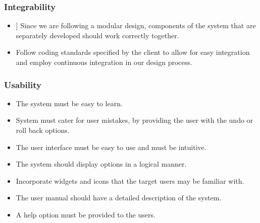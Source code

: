 \documentclass{article}
\begin{document}
		\subsubsection{Integrability}
		
			\begin{itemize}
				\item] Since we are following a modular design, components of the system that are separately developed should work correctly together.
				\item Follow coding standards specified by the client to allow for easy integration and employ continuous integration in our design process.
			\end{itemize}
		
		\subsubsection{Usability}
		
			\begin{itemize}
				\item The system must be easy to learn.
				\item System must cater for user mistakes, by providing the user with the undo or roll back options.
				\item The user interface must be easy to use and must be intuitive.
				\item The system should display options in a logical manner.
				\item Incorporate widgets and icons that the target users may be familiar with.
				\item The user manual should have a detailed description of the system.
				\item A help option must be provided to the users.
			\end{itemize}
\end{document}
